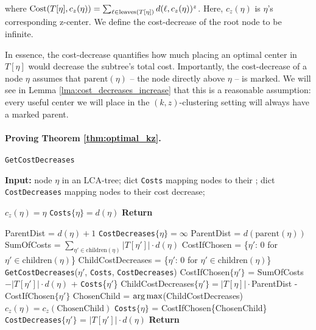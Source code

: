 \noindent where $\text{Cost}(T[\eta], c_z(\eta)) = \sum_{\ell \in \text{leaves}(T[\eta])} d(\ell, c_z(\eta))^z$. Here, $c_z(\eta)$ is $\eta$'s corresponding z-center. We define the cost-decrease of the root node to be infinite.

In essence, the cost-decrease quantifies how much placing an optimal center in $T[\eta]$ would decrease the subtree's total cost.  Importantly, the
cost-decrease of a node $\eta$ assumes that $\text{parent}(\eta)$ -- the node directly above $\eta$ -- is marked. We will see in Lemma
\ref{lma:cost_decreases_increase} that this is a reasonable assumption: every useful center we will place in the $(k, z)$-clustering setting will always have
a marked parent. 



\paragraph{Proving Theorem \ref{thm:optimal_kz}.}

\begin{algorithm}
    \caption{\texttt{GetCostDecreases}}\label{alg:corresp_z_centers}
    \textbf{Input:} node $\eta$ in an LCA-tree; dict \texttt{Costs} mapping nodes to their ; dict \texttt{CostDecreases} mapping nodes to their cost decrease;
    \begin{algorithmic}[1]
            \State $c_z(\eta) = \eta$
            \State \texttt{Costs}$\{\eta\} = d(\eta)$
            \State \textbf{Return}
        \EndIf \vspace*{0.2cm}

            \State ParentDist = $d(\eta) + 1$
            \State \texttt{CostDecreases}$\{\eta\} = \infty$
        \Else
            \State ParentDist = $d(\text{parent}(\eta))$
        \EndIf \vspace*{0.25cm}
        \State SumOfCosts = $\sum_{\eta' \in \text{children}(\eta)} |T[\eta']| \cdot d(\eta)$
        \State CostIfChosen = \{$\eta'$: 0 for $\eta' \in \text{children}(\eta)$\}
        \State ChildCostDecreases = \{$\eta'$: 0 for $\eta' \in \text{children}(\eta)$\}
            \State \texttt{GetCostDecreases}($\eta'$, \texttt{Costs}, \texttt{CostDecreases})
            \State CostIfChosen$\{\eta'\}$ = SumOfCosts $- |T[\eta']| \cdot d(\eta)$ + \texttt{Costs}\{$\eta'$\}
            \State ChildCostDecreases$\{\eta'\} = |T[\eta]| \cdot $ParentDist - CostIfChosen$\{\eta'\}$
        \EndFor \vspace*{0.25cm}
        \State ChosenChild = $\operatorname*{arg\,max}$(ChildCostDecreases)
        \State $c_z(\eta) = c_z(\text{ChosenChild})$
        \State \texttt{Costs}$\{\eta\}$ = CostIfChosen\{ChosenChild\}
            \State \texttt{CostDecreases}$\{\eta'\}$ = $|T[\eta']| \cdot d(\eta)$
        \EndFor
        \State \textbf{Return}
    \end{algorithmic}
\end{algorithm}


